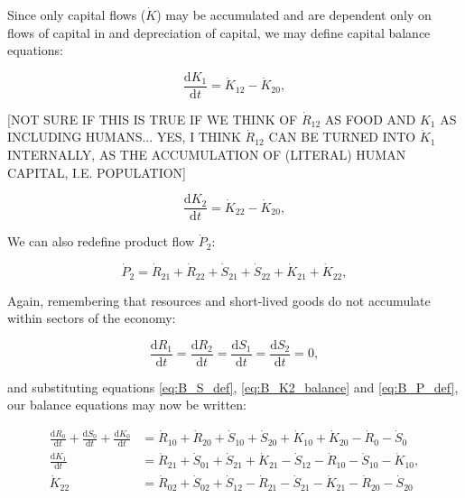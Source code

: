 Since only capital flows ($\dot{K}$) may be accumulated and are dependent only on flows of capital in and depreciation of capital, we may define capital balance equations:

\begin{equation} \label{eq:B_K1_balance}
	\frac{\mathrm{d}K_{1}}{\mathrm{d}t}
	=  \dot{K}_{12} - \dot{K}_{20},
\end{equation}

[NOT SURE IF THIS IS TRUE IF WE THINK OF $\dot{R}_{12}$ AS FOOD AND $K_{1}$ AS INCLUDING HUMANS... YES, I THINK $\dot{R}_{12}$ CAN BE TURNED INTO  $\dot{K}_{1}$ INTERNALLY, AS THE ACCUMULATION OF (LITERAL) HUMAN CAPITAL, I.E. POPULATION]

\begin{equation} \label{eq:B_K2_balance}
	\frac{\mathrm{d}K_{2}}{\mathrm{d}t}
	=  \dot{K}_{22} - \dot{K}_{20},
\end{equation}

We can also redefine product flow $\dot{P}_{2}$:

\begin{equation} \label{eq:B_P_def}
	\dot{P}_{2}
	= \dot{R}_{21}
	+ \dot{R}_{22}
	+ \dot{S}_{21}
	+ \dot{S}_{22}
	+ \dot{K}_{21}	 
	+ \dot{K}_{22},
\end{equation}


\noindent Again, remembering that resources and short-lived
goods do not accumulate within sectors of the economy:

\begin{equation}\label{eq:dR_and_dS_zero}
	\frac{\mathrm{d}R_{1}}{\mathrm{d}t}
	= \frac{\mathrm{d}R_{2}}{\mathrm{d}t} 
	= \frac{\mathrm{d}S_{1}}{\mathrm{d}t} 
	= \frac{\mathrm{d}S_{2}}{\mathrm{d}t} 
	= 0,
\end{equation}

\noindent and substituting equations \ref{eq:B_S_def},
\ref{eq:B_K2_balance}  and \ref{eq:B_P_def}, our balance 
equations may now be written:


\begin{align} \label{eq:B_CV_0_to_2_b}
	\frac{\mathrm{d}R_{0}}{\mathrm{d}t} 
	+ \frac{\mathrm{d}S_{0}}{\mathrm{d}t}	
	+ \frac{\mathrm{d}K_0}{\mathrm{d}t}		
	& = \dot{R}_{10} + \dot{R}_{20} 
	+ \dot{S}_{10} + \dot{S}_{20} 
	+ \dot{K}_{10} + \dot{K}_{20} 
	- \dot{R}_{0} 
	- \dot{S}_{0} 							\\
	\frac{\mathrm{d}K_{1}}{\mathrm{d}t}	
	& = \dot{R}_{21} 
	+ \dot{S}_{01} 
	+ \dot{S}_{21}
	+ \dot{K}_{21}
	- \dot{S}_{12} 
	- \dot{R}_{10} 
	- \dot{S}_{10} 
	- \dot{K}_{10},							\\
	\dot{K}_{22}
	& = \dot{R}_{02} 
	+ \dot{S}_{02} 
	+ \dot{S}_{12} 
	- \dot{R}_{21}
	- \dot{S}_{21}
	- \dot{K}_{21}
	- \dot{R}_{20} 
	- \dot{S}_{20} 
\end{align}



